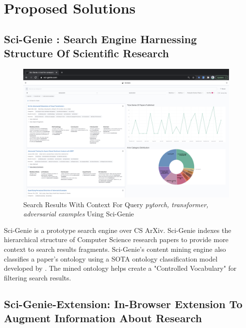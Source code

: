\chapter{Proposed Solutions}
\label{method}

\section{Sci-Genie : Search Engine Harnessing Structure Of Scientific Research}
\begin{figure}[h]
    \centering
    \includegraphics[width=\maxwidth{\textwidth}]{src/images/sci-genie-context-exp.png}
    \caption{Search Results With Context For Query \textit{pytorch, transformer, adversarial examples} Using Sci-Genie}
    \label{figure\arabic{figurecounter}}
\end{figure}

Sci-Genie is a prototype search engine over CS ArXiv. 
Sci-Genie indexes the hierarchical structure of Computer Science research papers 
to provide more context to search results fragments. 
Sci-Genie's content mining engine also classifies a paper's ontology using a SOTA ontology classification model
developed by \cite{salatino2020ontology}. The mined ontology helps create a "Controlled Vocabulary" for filtering search results. 

\section{Sci-Genie-Extension: In-Browser Extension To Augment Information About Research }

